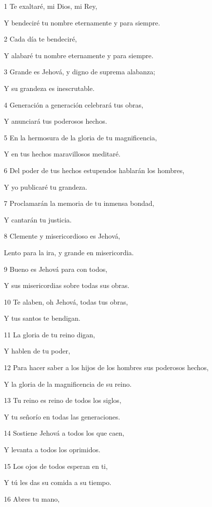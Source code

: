 \par 1 Te exaltaré, mi Dios, mi Rey,
\par Y bendeciré tu nombre eternamente y para siempre.
\par 2 Cada día te bendeciré,
\par Y alabaré tu nombre eternamente y para siempre.
\par 3 Grande es Jehová, y digno de suprema alabanza;
\par Y su grandeza es inescrutable.
\par 4 Generación a generación celebrará tus obras,
\par Y anunciará tus poderosos hechos.
\par 5 En la hermosura de la gloria de tu magnificencia,
\par Y en tus hechos maravillosos meditaré.
\par 6 Del poder de tus hechos estupendos hablarán los hombres,
\par Y yo publicaré tu grandeza.
\par 7 Proclamarán la memoria de tu inmensa bondad,
\par Y cantarán tu justicia.
\par 8 Clemente y misericordioso es Jehová,
\par Lento para la ira, y grande en misericordia.
\par 9 Bueno es Jehová para con todos,
\par Y sus misericordias sobre todas sus obras.
\par 10 Te alaben, oh Jehová, todas tus obras,
\par Y tus santos te bendigan.
\par 11 La gloria de tu reino digan,
\par Y hablen de tu poder,
\par 12 Para hacer saber a los hijos de los hombres sus poderosos hechos,
\par Y la gloria de la magnificencia de su reino.
\par 13 Tu reino es reino de todos los siglos,
\par Y tu señorío en todas las generaciones.
\par 14 Sostiene Jehová a todos los que caen,
\par Y levanta a todos los oprimidos.
\par 15 Los ojos de todos esperan en ti,
\par Y tú les das su comida a su tiempo.
\par 16 Abres tu mano,

